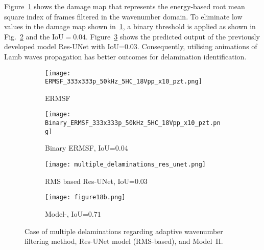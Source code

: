 \begin{sloppypar}
	Figure~\ref{fig:ERMSF} shows the damage map that represents the energy-based root mean square index of frames filtered in the wavenumber domain.
	To eliminate low values in the damage map shown in~\ref{fig:ERMSF}, a binary threshold is applied as shown in Fig.~\ref{fig:binary_ERMSF} and the IoU\(=0.04\).
	Figure~\ref{fig:Res_UNet} shows the predicted output of the previously developed model Res-UNet with IoU=$0.03$.
	Consequently, utilising animations of Lamb waves propagation has better outcomes for delamination identification.
	\begin{figure} [!ht]
		\begin{subfigure}[b]{.49\textwidth}
			\centering
			\texttt{[image: ERMSF\_333x333p\_50kHz\_5HC\_18Vpp\_x10\_pzt.png]}
			\caption{ERMSF}
			\label{fig:ERMSF}
		\end{subfigure}
		\hfill
		\begin{subfigure}[b]{.49\textwidth}
			\centering
			\texttt{[image: Binary\_ERMSF\_333x333p\_50kHz\_5HC\_18Vpp\_x10\_pzt.png]}
			\caption{Binary ERMSF, IoU=$0.04$} 
			\label{fig:binary_ERMSF}
		\end{subfigure}
		\hfill
		\begin{subfigure}[b]{.49\textwidth}
			\centering
			\texttt{[image: multiple\_delaminations\_res\_unet.png]}
			\caption{RMS based Res-UNet, IoU=$0.03$} 
			\label{fig:Res_UNet}
		\end{subfigure}
		\hfill
		\begin{subfigure}[b]{.49\textwidth}
			\centering
			\texttt{[image: figure18b.png]}
			\caption{Model-, IoU=\(0.71\)} 
			\label{fig:RMS_threshold_L3_S4_B_ijjeh_compare}
		\end{subfigure}
		\caption{Case of multiple delaminations regarding adaptive wavenumber filtering method, Res-UNet model (RMS-based), and Model~II.}
		\label{fig:comparison_all_models}
	\end{figure} 
\end{sloppypar}
